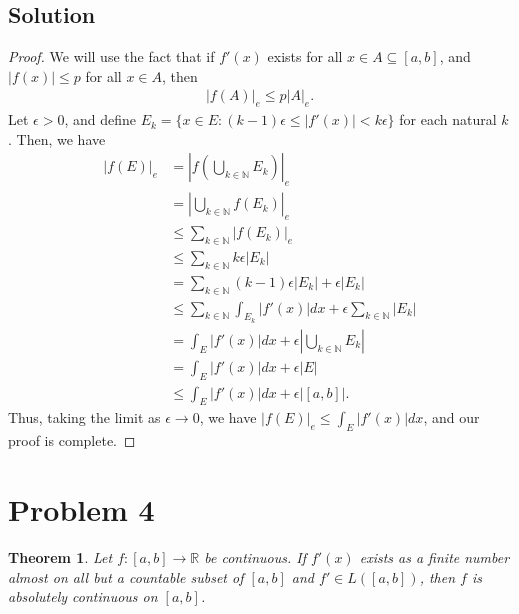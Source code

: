 \documentclass[10pt,a4paper]{article}
\theoremstyle{theorem}
\newtheorem{theorem}{Theorem}
\theoremstyle{definition}
\begin{document}
\subsection*{Solution}
\begin{proof}
We will use the fact that if $f'(x)$ exists for all $x \in A \subseteq [a, b]$, and $|f(x)| \leq p$ for all $x \in A$, then
\begin{align*}
|f(A)|_e \leq p|A|_e.
\end{align*}
Let $\epsilon > 0$, and define $E_k = \{x \in E: (k - 1)\epsilon \leq |f'(x)| < k \epsilon \}$ for each natural $k$. Then, we have
\begin{align*}
|f(E)|_e &= \left| f(\bigcup_{k \in \mathbb{N}} E_k) \right|_e\\
&= \left| \bigcup_{k \in \mathbb{N}} f(E_k) \right|_e\\
&\leq \sum_{k \in \mathbb{N}} \left|f(E_k) \right|_e\\
&\leq \sum_{k \in \mathbb{N}} k \epsilon |E_k|\\
&= \sum_{k \in \mathbb{N}} (k - 1) \epsilon |E_k| + \epsilon |E_k|\\
&\leq \sum_{k \in \mathbb{N}} \int_{E_k} |f'(x)|dx + \epsilon \sum_{k \in \mathbb{N}} |E_k|\\
&= \int_{E} |f'(x)|dx + \epsilon \left| \bigcup_{k \in \mathbb{N}} E_k\right|\\
&= \int_{E} |f'(x)|dx + \epsilon |E|\\
&\leq \int_{E} |f'(x)|dx + \epsilon |[a, b]|.
\end{align*}
Thus, taking the limit as $\epsilon \to 0$, we have
$|f(E)|_e \leq \int_{E} |f'(x)|dx$, and our proof is complete.
\end{proof}

\section*{Problem 4}
\begin{theorem}
Let $f:[a, b] \to \mathbb{R}$ be continuous. If $f'(x)$ exists as a finite number almost on all but a countable subset of $[a, b]$ and $f' \in L([a, b])$, then $f$ is absolutely continuous on $[a, b]$.
\end{theorem}
\end{document}
